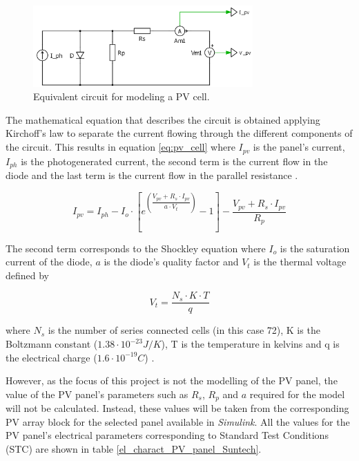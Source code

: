 \begin{figure}[H]
	\begin{center}
		\includegraphics[width=0.75\textwidth]{../Pictures/schematic_solar_cell}
		\caption{Equivalent circuit for modeling a PV cell.}
		\label{fig:eq_circuit_PVcell} 
	\end{center}	
\end{figure}

The mathematical equation that describes the circuit is obtained applying Kirchoff's law to separate the current flowing through the different components of the circuit. This results in equation \ref{eq:pv_cell} where $I_{pv}$ is the panel's current, $I_{ph}$ is the photogenerated current, the second term is the current flow in the diode and the last term is the current flow in the parallel resistance \cite{MPPTResearch}. 

\begin{equation} \label{eq:pv_cell}
I_{pv} = I_{ph} - I_{o} \cdot \left[ e^{\left({\dfrac{V_{pv} + R_s\cdot I_{pv}}{a \cdot V_{t}}}\right)}  - 1 \right]  - \dfrac{V_{pv} + R_{s}\cdot I_{pv}}{R_{p}}
\end{equation}

The second term corresponds to the Shockley equation where $I_{o}$ is the saturation current of the diode, $a$ is the diode's quality factor and $V_{t}$ is the thermal voltage defined by

\begin{equation} 
V_{t}=\dfrac{N_{s}\cdot K\cdot T}{q} 
\end{equation}

where $N_{s}$ is the number of series connected cells (in this case 72), K is the Boltzmann constant ($1.38 \cdot 10^{-23} J/K$), T is the temperature in kelvins and q is the electrical charge ($1.6 \cdot 10^{-19} C$) \cite{MPPTResearch}.

However, as the focus of this project is not the modelling of the PV panel, the value of the PV panel's parameters such as $R_{s}$, $R_{p}$ and $a$ required for the model will not be calculated. Instead, these values will be taken from the corresponding PV array block for the selected panel available in \textit{Simulink}. All the values for the PV panel's electrical parameters corresponding to Standard Test Conditions (STC) are shown in table \ref{el_charact_PV_panel_Suntech}.

